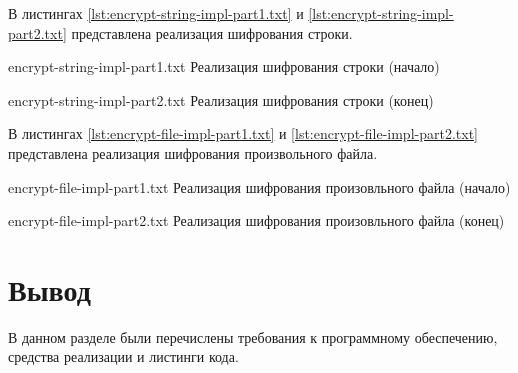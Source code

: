 В листингах \ref{lst:encrypt-string-impl-part1.txt}  и \ref{lst:encrypt-string-impl-part2.txt} представлена реализация шифрования строки.

{encrypt-string-impl-part1.txt} %
{Реализация шифрования строки (начало)} %

{encrypt-string-impl-part2.txt} %
{Реализация шифрования строки (конец)} %

В листингах \ref{lst:encrypt-file-impl-part1.txt}  и \ref{lst:encrypt-file-impl-part2.txt} представлена реализация шифрования произвольного файла.

{encrypt-file-impl-part1.txt} %
{Реализация шифрования произовльного файла (начало)} %

{encrypt-file-impl-part2.txt} %
{Реализация шифрования произовльного файла (конец)} %


%
%

\section*{Вывод}

В данном разделе были перечислены требования к программному обеспечению, средства реализации и листинги кода.

    